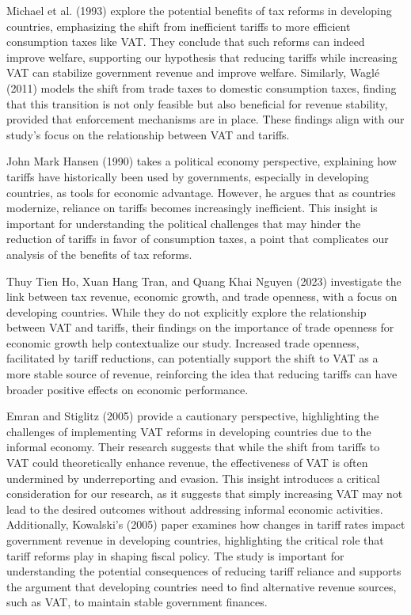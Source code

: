 \documentclass[12pt]{article}
\begin{document}
Michael et al. (1993) explore the potential benefits of tax reforms in developing countries, emphasizing the shift from inefficient tariffs to more efficient consumption taxes like VAT. They conclude that such reforms can indeed improve welfare, supporting our hypothesis that reducing tariffs while increasing VAT can stabilize government revenue and improve welfare. Similarly, Waglé (2011) models the shift from trade taxes to domestic consumption taxes, finding that this transition is not only feasible but also beneficial for revenue stability, provided that enforcement mechanisms are in place. These findings align with our study’s focus on the relationship between VAT and tariffs.

John Mark Hansen (1990) takes a political economy perspective, explaining how tariffs have historically been used by governments, especially in developing countries, as tools for economic advantage. However, he argues that as countries modernize, reliance on tariffs becomes increasingly inefficient. This insight is important for understanding the political challenges that may hinder the reduction of tariffs in favor of consumption taxes, a point that complicates our analysis of the benefits of tax reforms.

Thuy Tien Ho, Xuan Hang Tran, and Quang Khai Nguyen (2023) investigate the link between tax revenue, economic growth, and trade openness, with a focus on developing countries. While they do not explicitly explore the relationship between VAT and tariffs, their findings on the importance of trade openness for economic growth help contextualize our study. Increased trade openness, facilitated by tariff reductions, can potentially support the shift to VAT as a more stable source of revenue, reinforcing the idea that reducing tariffs can have broader positive effects on economic performance.

Emran and Stiglitz (2005) provide a cautionary perspective, highlighting the challenges of implementing VAT reforms in developing countries due to the informal economy. Their research suggests that while the shift from tariffs to VAT could theoretically enhance revenue, the effectiveness of VAT is often undermined by underreporting and evasion. This insight introduces a critical consideration for our research, as it suggests that simply increasing VAT may not lead to the desired outcomes without addressing informal economic activities. Additionally, Kowalski's (2005) paper examines how changes in tariff rates impact government revenue in developing countries, highlighting the critical role that tariff reforms play in shaping fiscal policy. The study is important for understanding the potential consequences of reducing tariff reliance and supports the argument that developing countries need to find alternative revenue sources, such as VAT, to maintain stable government finances.
\end{document}
